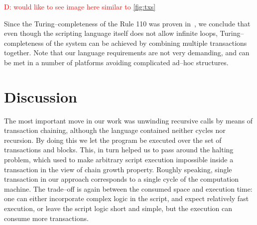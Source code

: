 \documentclass[runningheads]{llncs}
\newcommand{\dnote}[1]{\textcolor{red}{D: {#1}}}
\begin{document}
    \dnote{would like to see image here similar to \ref{fig:txs}}

    Since the Turing--completeness of the Rule 110 was proven
    in~\cite{cook2004universality}, we conclude that even though the scripting
    language itself does not allow infinite loops, Turing--completeness of the
    system can be achieved by combining multiple transactions together. Note
    that our language requirements are not very demanding, and can be met in a
    number of platforms avoiding complicated ad--hoc structures.

    \section{Discussion}
    \label{section3}
    The most important move in our work was unwinding recursive calls by means
    of transaction chaining, although the language contained neither cycles nor
    recursion. By doing this we let the program be executed over the set of
    transactions and blocks. This, in turn helped us to pass around the halting
    problem, which used to make arbitrary script execution impossible inside a
    transaction in the view of chain growth property. Roughly speaking, single
    transaction in our approach corresponds to a single cycle of the computation
    machine. The trade--off is again between the consumed space and execution time:
    one can either incorporate complex logic in the script, and expect
    relatively fast execution, or leave the script logic short and simple, but
    the execution can consume more transactions.
\end{document}
